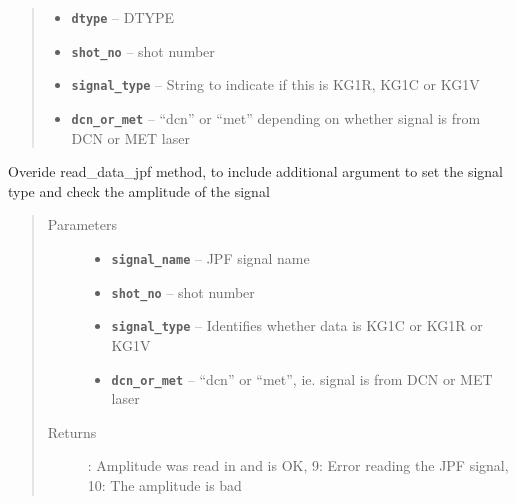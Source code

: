 \documentclass[letterpaper,10pt,english]{sphinxmanual}
\begin{document}
\begin{fulllineitems}
\begin{fulllineitems}
\begin{quote}
\begin{description}
\begin{itemize}
\item {} 
\textbf{\texttt{dtype}} -- DTYPE

\item {} 
\textbf{\texttt{shot\_no}} -- shot number

\item {} 
\textbf{\texttt{signal\_type}} -- String to indicate if this is KG1R, KG1C or KG1V

\item {} 
\textbf{\texttt{dcn\_or\_met}} -- ``dcn'' or ``met'' depending on whether signal is from DCN or MET laser

\end{itemize}

\end{description}\end{quote}

\end{fulllineitems}


\begin{fulllineitems}
\label{signal_amp:signal_amp.SignalAmp.read_data_jpf}
Overide read\_data\_jpf method, to include additional argument to set the signal type
and check the amplitude of the signal
\begin{quote}\begin{description}
\item[{Parameters}] \leavevmode\begin{itemize}
\item {} 
\textbf{\texttt{signal\_name}} -- JPF signal name

\item {} 
\textbf{\texttt{shot\_no}} -- shot number

\item {} 
\textbf{\texttt{signal\_type}} -- Identifies whether data is KG1C or KG1R or KG1V

\item {} 
\textbf{\texttt{dcn\_or\_met}} -- ``dcn'' or ``met'', ie. signal is from DCN or MET laser

\end{itemize}

\item[{Returns}] : Amplitude was read in and is OK,
9: Error reading the JPF signal,
10: The amplitude is bad


\end{description}
\end{quote}
\end{fulllineitems}
\end{fulllineitems}
\end{document}
